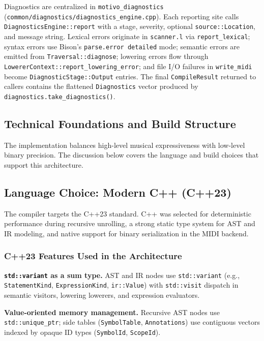 Diagnostics are centralized in \texttt{motivo\_diagnostics} (\texttt{common/diagnostics/diagnostics\_engine.cpp}).
Each reporting site calls \texttt{DiagnosticsEngine::report} with a stage, severity, optional \texttt{source::Location},
and message string.
Lexical errors originate in \texttt{scanner.l} via \texttt{report\_lexical}; syntax errors use Bison's
\texttt{parse.error
detailed} mode; semantic errors are emitted from \texttt{Traversal::diagnose}; lowering errors flow through
\texttt{LowererContext::report\_lowering\_error}; and file I/O failures in \texttt{write\_midi} become
\texttt{DiagnosticStage::Output} entries.
The final \texttt{CompileResult} returned to callers contains the flattened \texttt{Diagnostics} vector produced by
\texttt{diagnostics.take\_diagnostics()}.

\subsection{Technical Foundations and Build Structure}\label{subsec:implementation-foundations}

The implementation balances high-level musical expressiveness with low-level binary precision.
The discussion below covers the language and build choices that support this architecture.

\subsection{Language Choice: Modern C++ (C++23)}\label{detail-subsec:language-choice:-modern-c++-(c++23)}

The compiler targets the C++23 standard.
C++ was selected for deterministic performance during recursive unrolling, a strong static type system for AST and IR
modeling, and native support for binary serialization in the MIDI backend.

\subsubsection{C++23 Features Used in the Architecture}

\noindent \textbf{\texttt{std::variant} as a sum type.} AST and IR nodes use \texttt{std::variant} (e.g.,
\texttt{StatementKind}, \texttt{ExpressionKind}, \texttt{ir::Value}) with \texttt{std::visit} dispatch in semantic
visitors, lowering lowerers, and expression evaluators.

\noindent \textbf{Value-oriented memory management.} Recursive AST nodes use \texttt{std::unique\_ptr}; side tables
(\texttt{SymbolTable}, \texttt{Annotations}) use contiguous vectors indexed by opaque ID types
(\texttt{SymbolId}, \texttt{ScopeId}).

